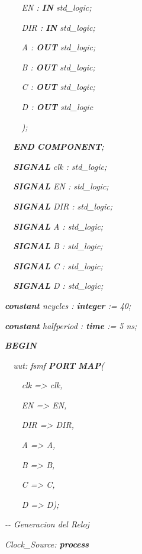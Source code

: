 {\itshape
\ \ \ \ EN : \textbf{IN} std\_logic;}

{\itshape
\ \ \ \ DIR : \textbf{IN} std\_logic;  }

{\itshape
\ \ \ \ A : \textbf{OUT} std\_logic;}

{\itshape
\ \ \ \ B : \textbf{OUT} std\_logic;}

{\itshape
\ \ \ \ C : \textbf{OUT} std\_logic;}

{\itshape
\ \ \ \ D : \textbf{OUT} std\_logic}

{\itshape
\ \ \ \ );}

{\itshape
\ \ \textbf{END} \textbf{COMPONENT};}

{\itshape
\ \ \textbf{SIGNAL} clk :  std\_logic;}

{\itshape
\ \ \textbf{SIGNAL} EN :  std\_logic;}

{\itshape
\ \ \textbf{SIGNAL} DIR :  std\_logic;}

{\itshape
\ \ \textbf{SIGNAL} A :  std\_logic;}

{\itshape
\ \ \textbf{SIGNAL} B :  std\_logic;}

{\itshape
\ \ \textbf{SIGNAL} C :  std\_logic;}

{\itshape
\ \ \textbf{SIGNAL} D :  std\_logic;}

{\itshape
 \textbf{constant} ncycles  : \textbf{integer} := 40;}

{\itshape
 \textbf{constant} halfperiod : \textbf{time  } := 5 ns;}

{\bfseries\itshape
BEGIN}

{\itshape
 \ \ uut: fsmf \textbf{PORT} \textbf{MAP}(}

{\itshape
\foreignlanguage{english}{\ \ \ \ }\foreignlanguage{spanish}{clk
={\textgreater} clk,}}

{\itshape
\ \ \ \ EN ={\textgreater} EN,}

{\itshape
\ \ \ \ DIR ={\textgreater} DIR,}

{\itshape
\ \ \ \ A ={\textgreater} A,}

{\itshape
\foreignlanguage{spanish}{\ \ \ \ }\foreignlanguage{english}{B
={\textgreater} B,}}

{\itshape
\ \ \ \ C ={\textgreater} C,}

{\itshape
\foreignlanguage{english}{\ \ \ \ }\foreignlanguage{spanish}{D
={\textgreater} D);}}

{\itshape
 {}-{}- Generacion del Reloj}

{\itshape
\foreignlanguage{spanish}{ }\foreignlanguage{english}{Clock\_Source:
}\foreignlanguage{english}{\textbf{process}}}

